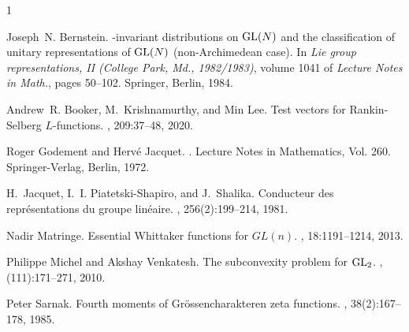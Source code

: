 \documentclass[reqno]{amsart}
\theoremstyle{plain}
\theoremstyle{definition}
\begin{document}
\def\cprime{$'$} \def\cprime{$'$} \def\cprime{$'$} \def\cprime{$'$}
\begin{thebibliography}{1}

  Joseph~N. Bernstein.
  -invariant distributions on {${\rm GL}(N)$} and the
  classification of unitary representations of {${\rm GL}(N)$}
  (non-{A}rchimedean case).
  \newblock In {\em Lie group representations, {II} ({C}ollege {P}ark, {M}d.,
    1982/1983)}, volume 1041 of {\em Lecture Notes in Math.}, pages 50--102.
  Springer, Berlin, 1984.

  Andrew~R. Booker, M.~Krishnamurthy, and Min Lee.
  \newblock Test vectors for {R}ankin-{S}elberg {$L$}-functions.
  , 209:37--48, 2020.

  Roger Godement and Herv{\'e} Jacquet.
  .
  \newblock Lecture Notes in Mathematics, Vol. 260. Springer-Verlag, Berlin,
  1972.

  H.~Jacquet, I.~I. Piatetski-Shapiro, and J.~Shalika.
  \newblock Conducteur des repr\'esentations du groupe lin\'eaire.
  , 256(2):199--214, 1981.

  Nadir Matringe.
  \newblock Essential {W}hittaker functions for {$GL(n)$}.
  , 18:1191--1214, 2013.

  Philippe Michel and Akshay Venkatesh.
  \newblock The subconvexity problem for {${\rm GL}_2$}.
  , (111):171--271, 2010.

  Peter Sarnak.
  \newblock Fourth moments of {G}r\"ossencharakteren zeta functions.
  , 38(2):167--178, 1985.

\end{thebibliography}
\end{document}

